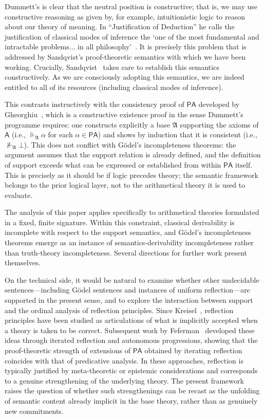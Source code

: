 \documentclass[reqno]{asl}
\newcommand{\base}[1]{\mathfrak{#1}}
\newcommand{\pa}{\textsf{A}}
\begin{document}
Dummett's is clear that the neutral position is constructive; that is, we may use constructive reasoning as given by, for example, intuitionistic logic to reason about our theory of meaning. In ``Justification of Deduction'' he calls the justification of classical modes of inference the `one of the most fundamental and intractable problems... in all
philosophy'~\cite{dummett1978justification}. It is precisely this problem that is addressed by Sandqvist's proof-theoretic semantics with which we have been working. Crucially, 
Sandqvist~\cite{Sandqvist2005inferentialist} takes care to establish this 
semantics constructively. As we are consciously adopting this semantics, we are indeed entitled to all of its resources (including classical modes of inference).  

This contrasts instructively with the consistency proof of $\mathsf{PA}$ developed by
Gheorghiu~\cite{gheorghiu2026arithemtic}, which
is a constructive existence proof in the sense Dummett's programme requires:
one constructs explicitly a base $\base{A}$ supporting the axioms of $\pa$
(i.e., $\Vdash_{\base{A}} \alpha$ for each $\alpha \in \mathsf{PA}$) and shows
by induction that it is consistent (i.e., $\not\Vdash_{\base{A}} \bot$). This
does not conflict with G\"{o}del's incompleteness theorems: the argument
assumes that the support relation is already defined, and the definition of
support exceeds what can be expressed or established from within $\mathsf{PA}$
itself. This is precisely as it should be if logic precedes theory; the
semantic framework belongs to the prior logical layer, not to the arithmetical
theory it is used to evaluate.

The analysis of this paper applies specifically to arithmetical theories
formulated in a fixed, finite signature. Within this constraint, classical
derivability is incomplete with respect to the support semantics, and
G\"{o}del's incompleteness theorems emerge as an instance of
semantics-derivability incompleteness rather than truth-theory incompleteness.
Several directions for further work present themselves.

On the technical side, it would be natural to examine whether other undecidable
sentences---including G\"{o}del sentences and instances of uniform
reflection---are supported in the present sense, and to explore the interaction
between support and the ordinal analysis of reflection principles. Since
Kreisel~\cite{Kreisel1965}, reflection principles have been studied as
articulations of what is implicitly accepted when a theory is taken to be
correct. Subsequent work by
Feferman~\cite{Feferman1962,Feferman_1975} developed these ideas through
iterated reflection and autonomous progressions, showing that the
proof-theoretic strength of extensions of $\mathsf{PA}$ obtained by iterating
reflection coincides with that of predicative analysis. In these approaches,
reflection is typically justified by meta-theoretic or epistemic considerations
and corresponds to a genuine strengthening of the underlying theory. The
present framework raises the question of whether such strengthenings can be
recast as the unfolding of semantic content already implicit in the base
theory, rather than as genuinely new commitments.
\end{document}
